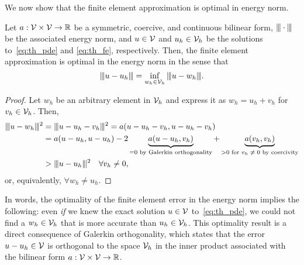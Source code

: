 We now show that the finite element approximation is optimal in energy norm.
\begin{proposition}
  \label{prop:th_energy_bound}
  Let $a: \mathcal{V} \times \mathcal{V} \to \mathbb{R}$ be a symmetric, coercive, and continuous bilinear form, $|\kern-1pt|\kern-1pt| \cdot |\kern-1pt|\kern-1pt|$ be the associated energy norm, and $u \in \mathcal{V}$ and $u_h \in \mathcal{V}_h$ be the solutions to~\eqref{eq:th_pde} and \eqref{eq:th_fe}, respectively. Then, the finite element approximation is optimal in the energy norm in the sense that
  \begin{equation}
    |\kern-1pt|\kern-1pt|  u - u_h  |\kern-1pt|\kern-1pt| = \inf_{w_h \in \mathcal{V}_h} |\kern-1pt|\kern-1pt|  u - w_h  |\kern-1pt|\kern-1pt|.
    \label{eq:th_energy_bound}
  \end{equation}
  \begin{proof}
    Let $w_h$ be an arbitrary element in $\mathcal{V}_h$ and express it as $w_h = u_h + v_h$ for $v_h \in \mathcal{V}_h$.  Then,
\begin{align*}
  \enorm{u - w_h}^2 &= \enorm{u - u_h - v_h}^2
  = a(u - u_h - v_h, u - u_h - v_h) \\
  &= a(u - u_h, u - u_h) - 2 \underbrace{ a(u - u_h, v_h) }_{= 0 \text{ by Galerkin orthogonality}} + \underbrace{ a(v_h,v_h) }_{> 0 \text{ for $v_h \neq 0$ by coercivity}}
  \\
  &> \enorm{u - u_h}^2 \quad \forall v_h \neq 0, %
\end{align*}
or, equivalently, $\forall w_h \neq u_h$.
  \end{proof}
\end{proposition}
In words, the optimality of the finite element error in the energy norm implies the following: even \emph{if} we knew the exact solution $u \in \mathcal{V}$ to~\eqref{eq:th_pde}, we could not find a $w_h \in \mathcal{V}_h$ that is more accurate than $u_h \in \mathcal{V}_h$. This optimality result is a direct consequence of Galerkin orthogonality, which states that the error $u - u_h \in \mathcal{V}$ is orthogonal to the space $\mathcal{V}_h$ in the inner product associated with the bilinear form $a: \mathcal{V} \times \mathcal{V} \to \mathbb{R}$.

